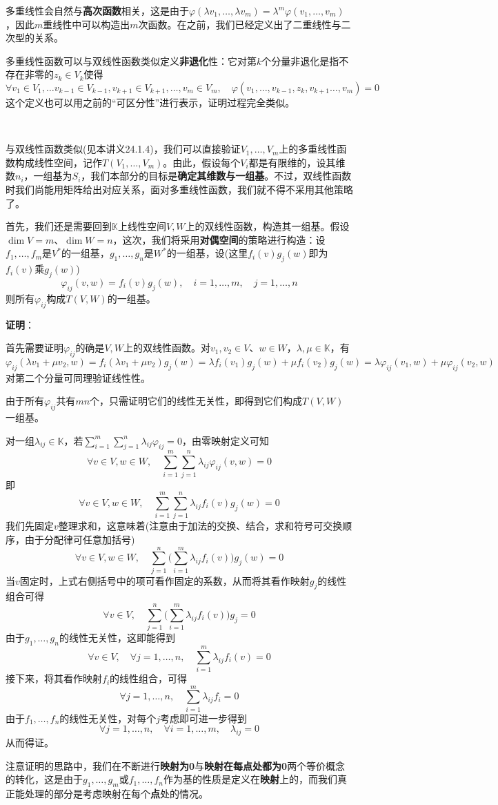 \documentclass[a4paper,UTF8,fontset=windows,AutoFakeBold]{ctexart}
\newcommand*{\note}{\noindent *}
\newcommand{\proo}[1]{{\vspace{5pt}\kaishu\noindent\textbf{证明}：\vspace{-3pt}
\begin{compactitem}
    \item[] #1
\end{compactitem}
}}
\begin{document}
\note 多重线性会自然与\textbf{高次函数}相关，这是由于$\varphi(\lambda v_1,\dots,\lambda v_m)=\lambda^m\varphi(v_1,\dots,v_m)$，因此$m$重线性中可以构造出$m$次函数。在之前，我们已经定义出了二重线性与二次型的关系。

\note 多重线性函数可以与双线性函数类似定义\textbf{非退化}性：它对第$k$个分量非退化是指不存在非零的$z_k\in V_k$使得
$$\forall v_1\in V_1,\dots v_{k-1}\in V_{k-1},v_{k+1}\in V_{k+1},\dots,v_m\in V_m,\quad\varphi(v_1,\dots,v_{k-1},z_k,v_{k+1}\dots,v_m)=0$$
这个定义也可以用之前的``可区分性''进行表示，证明过程完全类似。

\

与双线性函数类似(见本讲义24.1.4)，我们可以直接验证$V_1,\dots,V_m$上的多重线性函数构成线性空间，记作$T(V_1,\dots,V_m)$。由此，假设每个$V_i$都是有限维的，设其维数$n_i$，一组基为$S_i$，我们本部分的目标是\textbf{确定其维数与一组基}。不过，双线性函数时我们尚能用矩阵给出对应关系，面对多重线性函数，我们就不得不采用其他策略了。

首先，我们还是需要回到$\mathbb{K}$上线性空间$V,W$上的双线性函数，构造其一组基。假设$\dim V=m$、$\dim W=n$，这次，我们将采用\textbf{对偶空间}的策略进行构造：设$f_1,\dots,f_m$是$V^*$的一组基，$g_1,\dots,g_n$是$W^*$的一组基，设(这里$f_i(v)g_j(w)$即为$f_i(v)$乘$g_j(w)$)
$$\varphi_{ij}(v,w)=f_i(v)g_j(w),\quad i=1,\dots,m,\quad j=1,\dots,n$$
则所有$\varphi_{ij}$构成$T(V,W)$的一组基。

\proo{
    首先需要证明$\varphi_{ij}$的确是$V,W$上的双线性函数。对$v_1,v_2\in V$、$w\in W$，$\lambda,\mu\in\mathbb{K}$，有
    $$\varphi_{ij}(\lambda v_1+\mu v_2,w)=f_i(\lambda v_1+\mu v_2)g_j(w)=\lambda f_i(v_1)g_j(w)+\mu f_i(v_2)g_j(w)=\lambda\varphi_{ij}(v_1,w)+\mu\varphi_{ij}(v_2,w)$$
    对第二个分量可同理验证线性性。

    由于所有$\varphi_{ij}$共有$mn$个，只需证明它们的线性无关性，即得到它们构成$T(V,W)$一组基。

    对一组$\lambda_{ij}\in\mathbb{K}$，若$\sum_{i=1}^m\sum_{j=1}^n\lambda_{ij}\varphi_{ij}=0$，由零映射定义可知
    $$\forall v\in V,w\in W,\quad\sum_{i=1}^m\sum_{j=1}^n\lambda_{ij}\varphi_{ij}(v,w)=0$$
    即
    $$\forall v\in V,w\in W,\quad\sum_{i=1}^m\sum_{j=1}^n\lambda_{ij}f_i(v)g_j(w)=0$$
    我们先固定$v$整理求和，这意味着(注意由于加法的交换、结合，求和符号可交换顺序，由于分配律可任意加括号)
    $$\forall v\in V,w\in W,\quad\sum_{j=1}^n\bigg(\sum_{i=1}^m\lambda_{ij}f_i(v)\bigg)g_j(w)=0$$
    当$v$固定时，上式右侧括号中的项可看作固定的系数，从而将其看作映射$g_j$的线性组合可得
    $$\forall v\in V,\quad\sum_{j=1}^n\bigg(\sum_{i=1}^m\lambda_{ij}f_i(v)\bigg)g_j=0$$
    由于$g_1,\dots,g_n$的线性无关性，这即能得到
    $$\forall v\in V,\quad\forall j=1,\dots,n,\quad\sum_{i=1}^m\lambda_{ij}f_i(v)=0$$
    接下来，将其看作映射$f_i$的线性组合，可得
    $$\forall j=1,\dots,n,\quad\sum_{i=1}^m\lambda_{ij}f_i=0$$
    由于$f_1,\dots,f_n$的线性无关性，对每个$j$考虑即可进一步得到
    $$\forall j=1,\dots,n,\quad\forall i=1,\dots,m,\quad\lambda_{ij}=0$$
    从而得证。

    \note 注意证明的思路中，我们在不断进行\textbf{映射为0}与\textbf{映射在每点处都为0}两个等价概念的转化，这是由于$g_1,\dots,g_m$或$f_1,\dots,f_n$作为基的性质是定义在\textbf{映射}上的，而我们真正能处理的部分是考虑映射在每个\textbf{点}处的情况。
}
\end{document}
